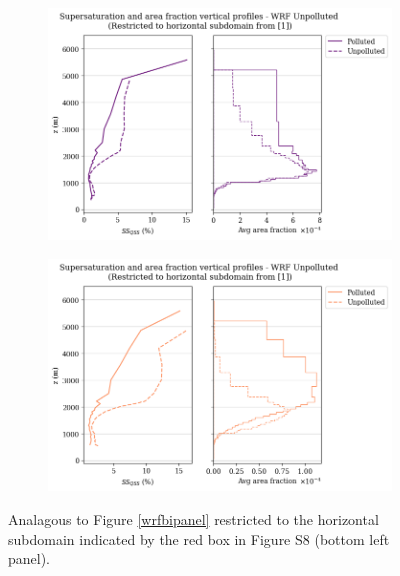 \documentclass{article}
\begin{document}
\begin{figure}[ht]
	\centering
	\begin{subfigure}{0.7\textwidth}
		\includegraphics[width=\textwidth]{revmywrf/v4_FINAL_subdom_bipanel_ss_qss_vs_z_allpts_figure.png}
		\caption{}
		\label{wrfsubdombipanelallpts}
	\end{subfigure}
	\begin{subfigure}{0.7\textwidth}
		\includegraphics[width=\textwidth]{revmywrf/v4_FINAL_subdom_bipanel_ss_qss_vs_z_up10perc_figure.png}
		\caption{}
		\label{wrfsubdombipanelup50perc}
	\end{subfigure}
	\caption{Analagous to Figure \ref{wrfbipanel} restricted to the horizontal subdomain indicated by the red box in Figure S8 (bottom left panel).}
	\label{wrfsubdombipanel}
\end{figure}

\clearpage
\newpage
\end{document}
